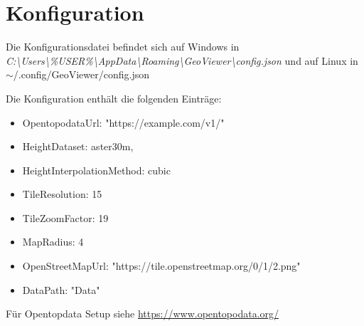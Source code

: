 \chapter{Konfiguration}
Die Konfigurationsdatei befindet sich auf Windows in\\
\emph{C:\textbackslash Users\textbackslash\%USER\%\textbackslash AppData\textbackslash Roaming\textbackslash GeoViewer\textbackslash config.json} und auf Linux in\\ $\sim$/.config/GeoViewer/config.json

Die Konfiguration enthält die folgenden Einträge:

\begin{itemize}
    \item OpentopodataUrl: "https://example.com/v1/"
    \item HeightDataset: aster30m,
    \item HeightInterpolationMethod: cubic
    \item TileResolution: 15
    \item TileZoomFactor: 19
    \item MapRadius: 4
    \item OpenStreetMapUrl: "https://tile.openstreetmap.org/{0}/{1}/{2}.png"
    \item DataPath: "Data"
\end{itemize}

Für Opentopdata Setup siehe \url{https://www.opentopodata.org/}
